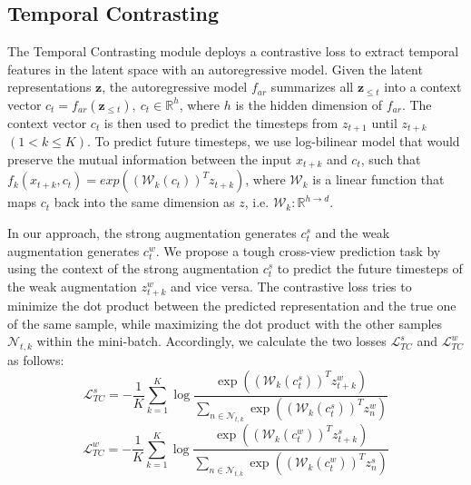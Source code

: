 \documentclass{article}
\begin{document}
\subsection{Temporal Contrasting}
The Temporal Contrasting module deploys a contrastive loss to extract temporal features in the latent space with an autoregressive model.
Given the latent representations $\mathbf{z}$, the autoregressive model $f_{ar}$ summarizes all $\mathbf{z}_{\leq t}$ into a context vector $c_t = f_{ar}(\mathbf{z}_{\leq t}),~ c_t \in \mathbb{R}^{h}$, where $h$ is the hidden dimension of $f_{ar}$.
The context vector $c_t$ is then used to predict the timesteps from $z_{t+1}$ until $z_{t+k}$ $(1<k\leq K)$. To predict future timesteps, we use log-bilinear model that would preserve the mutual information between the input $x_{t+k}$ and $c_t$, such that $f_k(x_{t+k}, c_t) = exp((\mathcal{W}_k (c_t))^T z_{t+k})$, where $\mathcal{W}_k$ is a linear function that maps $c_t$ back into the same dimension as $z$, i.e. $\mathcal{W}_k : \mathbb{R}^{h \rightarrow d}$.

In our approach, the strong augmentation generates $c_t^s$ and the weak augmentation generates $c_t^w$. We propose a tough cross-view prediction task by using the context of the strong augmentation $c_t^s$ to predict the future timesteps of the weak augmentation $z_{t+k}^w$ and vice versa. The contrastive loss tries to minimize the dot product between the predicted representation and the true one of the same sample, while maximizing the dot product with the other samples $\mathcal{N}_{t, k}$ within the mini-batch.
Accordingly, we calculate the two losses $ \mathcal{L}_{TC}^s$ and $ \mathcal{L}_{TC}^w$ as follows:
\begin{equation}
    \mathcal{L}_{TC}^s=-\frac{1}{K} \sum_{k=1}^{K} \log \frac{\exp ((\mathcal{W}_k (c_t^s))^T z_{t+k}^{w})}{\sum_{n \in \mathcal{N}_{t, k}} \exp ((\mathcal{W}_k (c_t^s))^T z_{n}^w)}
\end{equation}
\begin{equation}
    \mathcal{L}_{TC}^w=-\frac{1}{K} \sum_{k=1}^{K} \log \frac{\exp ((\mathcal{W}_k (c_t^w))^T z_{t+k}^{s})}{\sum_{n \in \mathcal{N}_{t, k}} \exp ((\mathcal{W}_k (c_t^w))^T z_{n}^s)}
\end{equation}
\end{document}
